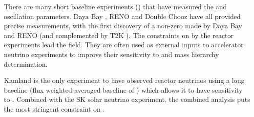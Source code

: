 There are many short baseline experiments () that have measured the  and  oscillation parameters. Daya Bay \cite{PhysRevLett.108.171803}, RENO \cite{PhysRevLett.108.191802} and Double Chooz \cite{PhysRevLett.108.131801} have all provided precise measurements, with the first discovery of a non-zero  made by Daya Bay and RENO (and complemented by T2K \cite{PhysRevLett.108.131801}). The constraints on  by the reactor experiments lead the field. They are often used as external inputs to accelerator neutrino experiments to improve their sensitivity to  and mass hierarchy determination.

Kamland \cite{Decowski2016-hh} is the only experiment to have observed reactor neutrinos using a long baseline (flux weighted averaged baseline of ) which allows it to have sensitivity to . Combined with the SK solar neutrino experiment, the combined analysis puts the most stringent constraint on  \cite{PhysRevD.83.052002}.

